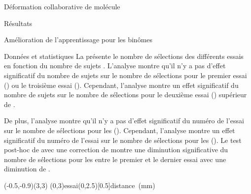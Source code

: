 \documentclass[myfrancais,ngerman,english,french]{mythesis}
\begin{document}
\begin{mychapter}{Déformation collaborative de molécule}
\begin{mysection}{Résultats}
\begin{mysubsection}{Amélioration de l'apprentissage pour les binômes}
\begin{mysubsubsection}{Données et statistiques}
					La  présente le nombre de sélections  des différents essais  en fonction du nombre de sujets .
					L'analyse montre qu'il n'y a pas d'effet significatif du nombre de sujets  sur le nombre de sélections  pour le premier essai () ou le troisième essai ().
					Cependant, l'analyse montre un effet significatif du nombre de sujets  sur le nombre de sélections  pour le deuxième essai () supérieur de .

					De plus, l'analyse montre qu'il n'y a pas d'effet significatif du numéro de l'essai  sur le nombre de sélections  pour les  ().
					Cependant, l'analyse montre un effet significatif du numéro de l'essai  sur le nombre de sélections  pour les  ().
					Le test post-hoc de  avec une correction de  montre une diminution significative du nombre de sélections pour les  entre le premier et le dernier essai avec une diminution de .

					\begin{myfigure}
						\begin{myps}(-0.5,-0.9)(3,3)
							\myaxes(0,3){essai}(0,2.5)[0.5]{distance~(mm)}
						\end{myps}
					\end{myfigure}


\end{mysubsubsection}
\end{mysubsection}
\end{mysection}
\end{mychapter}
\end{document}
